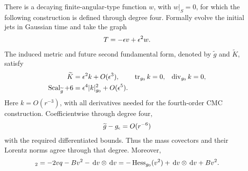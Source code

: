 \begin{lemma}
\label{ads:lem:slice}
There is a decaying finite-angular-type function \(w\), with
\(w|_S=0\), for which the following construction is defined through
degree four.  Formally evolve the initial jets in Gaussian time and
take the graph
\begin{equation}
 T=-\epsilon v+\epsilon^2w.
 \label{ads:quart:time-graph}
\end{equation}
The induced metric and future second fundamental form, denoted by
\(\widetilde g\) and \(\widetilde K\), satisfy
\begin{align}
 \widetilde K&=\epsilon^2k+O(\epsilon^3),
 &\operatorname{tr}_{g_0}k&=0,&\operatorname{div}_{g_0}k&=0,
 \label{ads:quart:leading-k}\\
 \operatorname{Scal}_{\widetilde g}+6
   &=\epsilon^4|k|_{g_0}^2+O(\epsilon^5).
 \label{ads:quart:scalar-four}
\end{align}
Here \(k=O(r^{-3})\), with all derivatives needed for the fourth-order
CMC construction.  Coefficientwise through degree four,
\begin{equation}
 \widetilde g-g_\epsilon=O(r^{-6})
 \label{ads:quart:metric-decay}
\end{equation}
with the required differentiated bounds.  Thus the mass covectors and
their Lorentz norms agree through that degree.  Moreover,
\begin{equation}
 [\widetilde g-g_\eps]_2
   =-2vq-Bv^2-\dd v\otimes\dd v
   =-\Hess_{g_0}(v^2)+\dd v\otimes\dd v+Bv^2.
 \label{ads:quart:metric-two}
\end{equation}
\end{lemma}

